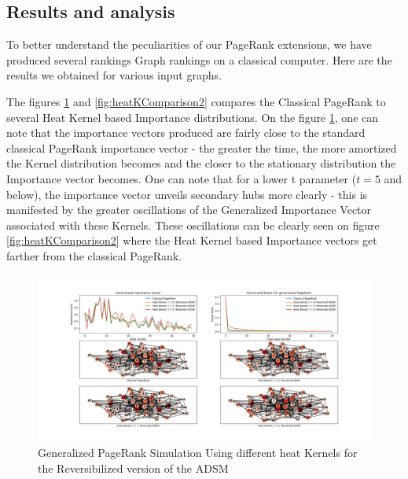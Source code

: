 \documentclass{article}
\begin{document}
\subsection{Results and analysis}
\label{sec:results}
To better understand the peculiarities of our PageRank extensions, we have produced several rankings Graph rankings on a classical computer. Here are the results we obtained for various input graphs.

The figures \ref{fig:heatKComparison} and \ref{fig:heatKComparison2} compares the Classical PageRank to several Heat Kernel based Importance distributions. On the figure \ref{fig:heatKComparison}, one can note that the importance vectors produced are fairly close to the standard classical PageRank importance vector - the greater the time, the more amortized the Kernel distribution becomes and the closer to the stationary distribution the Importance vector becomes. One can note that for a lower t parameter ($t=5$ and below), the importance vector unveils secondary hubs more clearly - this is manifested by the greater oscillations of the Generalized Importance Vector associated with these Kernels. These oscillations can be clearly seen on figure \ref{fig:heatKComparison2} where the Heat Kernel based Importance vectors get farther from the classical PageRank.

\begin{figure}[h!]
    \centering
    \centerline{
    \includegraphics[width= 1.55\textwidth]{results_figures/heat_kernel_comparison.png}
    }
    \caption{Generalized PageRank Simulation Using different heat Kernels for the Reversibilized version of the ADSM}
    \label{fig:heatKComparison}
\end{figure}
\end{document}
